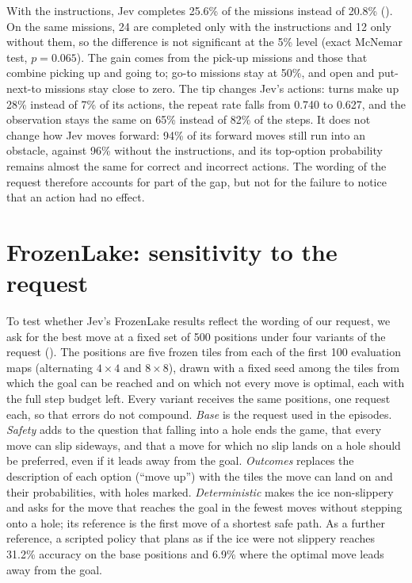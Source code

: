 \documentclass[table]{article}
\begin{document}
\begin{table}[!htb]
\centering
\caption{Jev on the 250 BabyAI-Text missions with the original prompt and with BALROG's instruction prompt added to the state. Forward moves into an obstacle: share of \emph{go forward} actions after the first step that leave the observation unchanged. Top $p$: mean top-option probability for actions that agree or disagree with the bot.}
\label{tab:babyai-instructions}
\footnotesize
\setlength{\tabcolsep}{4pt}

\end{table}

With the instructions, Jev completes 25.6\% of the missions instead of 20.8\% (). On the same missions, 24 are completed only with the instructions and 12 only without them, so the difference is not significant at the 5\% level (exact McNemar test, $p=0.065$). The gain comes from the pick-up missions and those that combine picking up and going to; go-to missions stay at 50\%, and open and put-next-to missions stay close to zero. The tip changes Jev's actions: turns make up 28\% instead of 7\% of its actions, the repeat rate falls from 0.740 to 0.627, and the observation stays the same on 65\% instead of 82\% of the steps. It does not change how Jev moves forward: 94\% of its forward moves still run into an obstacle, against 96\% without the instructions, and its top-option probability remains almost the same for correct and incorrect actions. The wording of the request therefore accounts for part of the gap, but not for the failure to notice that an action had no effect.

\section{FrozenLake: sensitivity to the request}
\label{app:frozenlake}

To test whether Jev's FrozenLake results reflect the wording of our request, we ask for the best move at a fixed set of 500 positions under four variants of the request (). The positions are five frozen tiles from each of the first 100 evaluation maps (alternating $4{\times}4$ and $8{\times}8$), drawn with a fixed seed among the tiles from which the goal can be reached and on which not every move is optimal, each with the full step budget left. Every variant receives the same positions, one request each, so that errors do not compound. \emph{Base} is the request used in the episodes. \emph{Safety} adds to the question that falling into a hole ends the game, that every move can slip sideways, and that a move for which no slip lands on a hole should be preferred, even if it leads away from the goal. \emph{Outcomes} replaces the description of each option (``move up'') with the tiles the move can land on and their probabilities, with holes marked. \emph{Deterministic} makes the ice non-slippery and asks for the move that reaches the goal in the fewest moves without stepping onto a hole; its reference is the first move of a shortest safe path. As a further reference, a scripted policy that plans as if the ice were not slippery reaches 31.2\% accuracy on the base positions and 6.9\% where the optimal move leads away from the goal.
\end{document}

